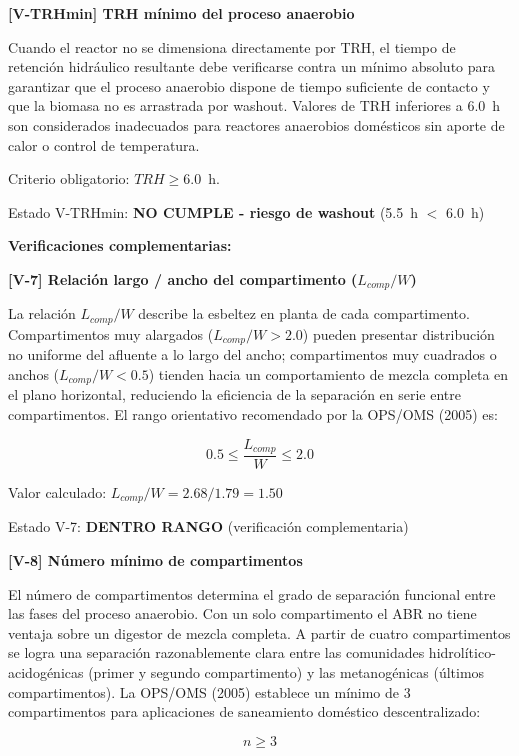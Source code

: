 \documentclass[12pt,a4paper]{article}
\begin{document}
\textbf{[V-TRHmin] TRH mínimo del proceso anaerobio}

Cuando el reactor no se dimensiona directamente por TRH, el tiempo de retención hidráulico resultante debe verificarse contra un mínimo absoluto para garantizar que el proceso anaerobio dispone de tiempo suficiente de contacto y que la biomasa no es arrastrada por washout. Valores de TRH inferiores a 6.0~h son considerados inadecuados para reactores anaerobios domésticos sin aporte de calor o control de temperatura.

Criterio obligatorio: $TRH \geq 6.0$~h.

Estado V-TRHmin: \textbf{NO CUMPLE - riesgo de washout} (5.5~h $<$ 6.0~h)

\textbf{Verificaciones complementarias:}

\textbf{[V-7] Relación largo / ancho del compartimento ($L_{comp} / W$)}

La relación $L_{comp} / W$ describe la esbeltez en planta de cada compartimento. Compartimentos muy alargados ($L_{comp} / W > 2.0$) pueden presentar distribución no uniforme del afluente a lo largo del ancho; compartimentos muy cuadrados o anchos ($L_{comp} / W < 0.5$) tienden hacia un comportamiento de mezcla completa en el plano horizontal, reduciendo la eficiencia de la separación en serie entre compartimentos. El rango orientativo recomendado por la OPS/OMS (2005) es:

\begin{equation}
0.5 \leq \frac{L_{comp}}{W} \leq 2.0
\end{equation}

Valor calculado: $L_{comp} / W = 2.68 / 1.79 = 1.50$

Estado V-7: \textbf{DENTRO RANGO} (verificación complementaria)

\textbf{[V-8] Número mínimo de compartimentos}

El número de compartimentos determina el grado de separación funcional entre las fases del proceso anaerobio. Con un solo compartimento el ABR no tiene ventaja sobre un digestor de mezcla completa. A partir de cuatro compartimentos se logra una separación razonablemente clara entre las comunidades hidrolítico-acidogénicas (primer y segundo compartimento) y las metanogénicas (últimos compartimentos). La OPS/OMS (2005) establece un mínimo de 3 compartimentos para aplicaciones de saneamiento doméstico descentralizado:

\begin{equation}
n \geq 3
\end{equation}
\end{document}
